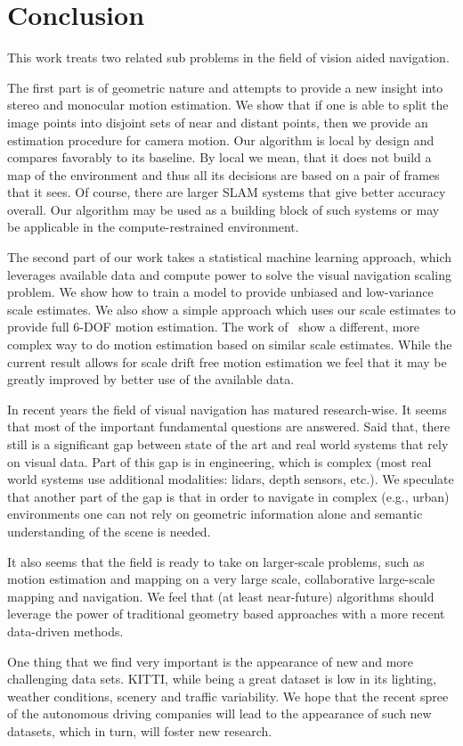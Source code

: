 \chapter{Conclusion}

This work treats two related sub problems in the field of vision aided
navigation.

The first part is of geometric nature and attempts to provide a new
insight into stereo and monocular motion estimation.  We show that if
one is able to split the image points into disjoint sets of near and
distant points, then we provide an estimation procedure for camera
motion.  Our algorithm is local by design and compares favorably to
its baseline.  By local we mean, that it does not build a map of the
environment and thus all its decisions are based on a pair of frames
that it sees.  Of course, there are larger SLAM systems that give
better accuracy overall.  Our algorithm may be used as a building
block of such systems or may be applicable in the compute-restrained
environment.

The second part of our work takes a statistical machine learning
approach, which leverages available data and compute power to solve
the visual navigation scaling problem.  We show how to train a model
to provide unbiased and low-variance scale estimates.  We also show a
simple approach which uses our scale estimates to provide full 6-DOF
motion estimation.  The work of~\cite{frost2017using} show a
different, more complex way to do motion estimation based on similar
scale estimates.  While the current result allows for scale drift free
motion estimation we feel that it may be greatly improved by better
use of the available data.

In recent years the field of visual navigation has matured
research-wise. It seems that most of the important fundamental
questions are answered.  Said that, there still is a significant gap
between state of the art and real world systems that rely on visual
data.  Part of this gap is in engineering, which is complex (most real
world systems use additional modalities: lidars, depth sensors,
etc.). We speculate that another part of the gap is that in order to
navigate in complex (e.g., urban) environments one can not rely on
geometric information alone and semantic understanding of the scene is
needed.

It also seems that the field is ready to take on larger-scale
problems, such as motion estimation and mapping on a very large scale,
collaborative large-scale mapping and navigation.  We feel that (at
least near-future) algorithms should leverage the power of traditional
geometry based approaches with a more recent data-driven methods.

One thing that we find very important is the appearance of new and
more challenging data sets.  KITTI, while being a great dataset is low
in its lighting, weather conditions, scenery and traffic variability.
We hope that the recent spree of the autonomous driving companies will
lead to the appearance of such new datasets, which in turn, will
foster new research.

